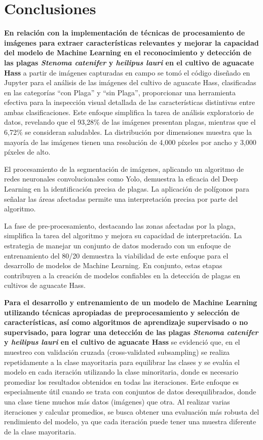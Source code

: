 \section{Conclusiones}

\textbf{En relación con la implementación de técnicas de procesamiento de imágenes para extraer características relevantes y mejorar la capacidad del modelo de Machine Learning en el reconocimiento y detección de las plagas \textit{Stenoma catenifer} y \textit{heilipus lauri} en el cultivo de aguacate Hass} a partir de imágenes capturadas en campo se tomó el código diseñado en Jupyter para el análisis de las imágenes del cultivo de aguacate Hass, clasificadas en las categorías ``con Plaga'' y ``sin Plaga'', proporcionar una herramienta efectiva para la inspección visual detallada de las características distintivas entre ambas clasificaciones. Este enfoque simplifica la tarea de análisis exploratorio de datos, revelando que el 93,28\% de las imágenes presentan plagas, mientras que el 6,72\% se consideran saludables. La distribución por dimensiones muestra que la mayoría de las imágenes tienen una resolución de 4,000 píxeles por ancho y 3,000 píxeles de alto.

El procesamiento de la segmentación de imágenes, aplicando un algoritmo de redes neuronales convolucionales como Yolo, demuestra la eficacia del Deep Learning en la identificación precisa de plagas. La aplicación de polígonos para señalar las áreas afectadas permite una interpretación precisa por parte del algoritmo.

La fase de pre-procesamiento, destacando las zonas afectadas por la plaga, simplifica la tarea del algoritmo y mejora su capacidad de interpretación. La estrategia de manejar un conjunto de datos moderado con un enfoque de entrenamiento del 80/20 demuestra la viabilidad de este enfoque para el desarrollo de modelos de Machine Learning. En conjunto, estas etapas contribuyen a la creación de modelos confiables en la detección de plagas en cultivos de aguacate Hass.

\newpage

\textbf{Para el desarrollo y entrenamiento de un modelo de Machine Learning utilizando técnicas apropiadas de preprocesamiento y selección de características, así como algoritmos de aprendizaje supervisado o no supervisado, para lograr una detección de las plagas \textit{Stenoma catenifer} y \textit{heilipus lauri} en el cultivo de aguacate Hass} se evidenció que, en el muestreo con validación cruzada (cross-validated subsampling) se realiza repetidamente a la clase mayoritaria para equilibrar las clases y se evalúa el modelo en cada iteración utilizando la clase minoritaria, donde es necesario promediar los resultados obtenidos en todas las iteraciones. Este enfoque es especialmente útil cuando se trata con conjuntos de datos desequilibrados, donde una clase tiene muchos más datos (imágenes) que otra. Al realizar varias iteraciones y calcular promedios, se busca obtener una evaluación más robusta del rendimiento del modelo, ya que cada iteración puede tener una muestra diferente de la clase mayoritaria.

